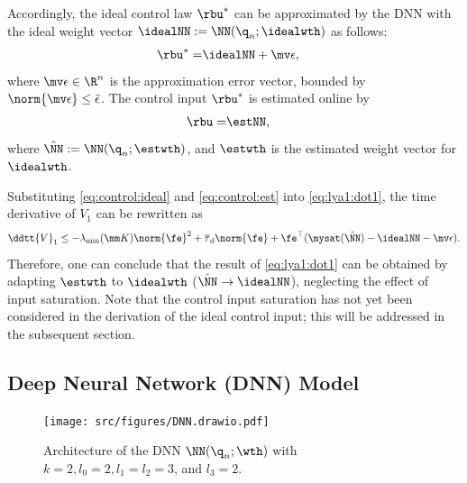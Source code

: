 \documentclass[lettersize,journal]{IEEEtran}
\begin{document}
Accordingly, the ideal control law $\rbu^*$ can be approximated by the DNN with the ideal weight vector $\idealNN:=\NN({\q}_n;\idealwth)$ as follows:
\begin{align}
    \rbu^*=& \idealNN+\mv\epsilon
    ,
    \label{eq:control:ideal}
\end{align}
where $\mv\epsilon\in\R^n$ is the approximation error vector, bounded by $\norm{\mv\epsilon}\le \bar{\epsilon}$.
The control input $\rbu^*$ is estimated online by
\begin{align}
    \rbu =& \estNN,
    \label{eq:control:est}
\end{align}
where $\hat\NN:=\NN({\q}_n;\estwth)$, and  $\estwth$ is the estimated weight vector for $\idealwth$.

Substituting \eqref{eq:control:ideal} and \eqref{eq:control:est} into \eqref{eq:lya1:dot1}, the time derivative of $V_1$ can be rewritten as
\begin{equation}
    \ddtt{V}_1
    \le 
    -\lambda_{\min}(\mm K)\norm{\fe}^2
    +
    \overline\tau_d\norm{\fe}
    +
    \fe^\top (\mysat(\hat\NN)-\idealNN-\mv\epsilon)
    .
    \label{eq:lya1:dot2}
\end{equation}
Therefore, one can conclude that the result of \eqref{eq:lya1:dot1} can be obtained by adapting $\estwth$ to $\idealwth$ (\ie $\hat\NN\to\idealNN$), neglecting the effect of input saturation.
Note that the control input saturation has not yet been considered in the derivation of the ideal control input; this will be addressed in the subsequent section.

\subsection{Deep Neural Network (DNN) Model}\label{sec:sub:NN definition}

\begin{figure}[t]
    \centering
    \texttt{[image: src/figures/DNN.drawio.pdf]}
    \caption{
        Architecture of the DNN $\NN({\q}_n;\wth)$ with $k=2,l_0=2,l_1=l_2=3$, and $l_3=2$.
    }
    \label{fig:DNN}
\end{figure}
\end{document}
